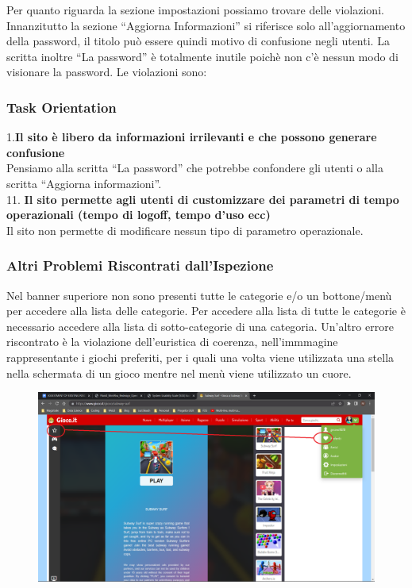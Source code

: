 \documentclass[../Report.tex]{subfiles}
\begin{document}
    Per quanto riguarda la sezione impostazioni possiamo trovare delle violazioni.
    Innanzitutto la sezione “Aggiorna Informazioni” si riferisce solo all’aggiornamento della password, il titolo può essere quindi motivo di confusione negli utenti. La scritta inoltre “La password” è totalmente inutile poichè non c’è nessun modo di visionare la password.
    Le violazioni sono:

    \subsubsection{Task Orientation}
    1.\textbf{Il sito è libero da informazioni irrilevanti e che possono generare confusione}\\
	Pensiamo alla scritta “La password” che potrebbe confondere gli utenti o alla scritta “Aggiorna informazioni”.\\
    
    11.\textbf{  Il sito permette agli utenti di customizzare dei parametri di tempo operazionali (tempo di logoff, tempo d’uso ecc)}\\
    Il sito non permette di modificare nessun tipo di parametro operazionale. \\

    \subsubsection{Altri Problemi Riscontrati dall’Ispezione}
    Nel banner superiore non sono presenti tutte le categorie e/o un bottone/menù per accedere alla lista delle categorie. Per accedere alla lista di tutte le categorie è necessario accedere alla lista di sotto-categorie di una categoria. 
    Un’altro errore riscontrato è la violazione dell’euristica di coerenza, nell’immmagine rappresentante i giochi preferiti, per i quali una volta viene utilizzata una stella nella schermata di un gioco mentre nel menù viene utilizzato un cuore.

    \begin{figure}[H]
        \includegraphics[width=\linewidth]{Assestment18.png}
        \centering
    \end{figure}
\end{document}

